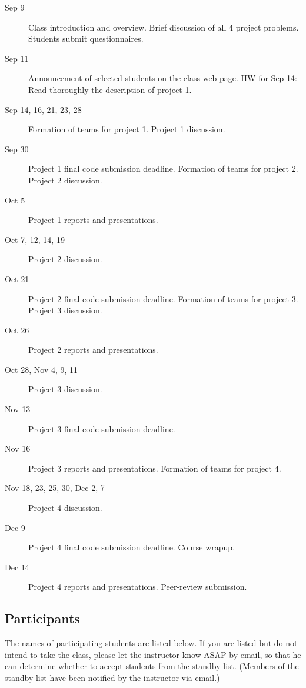 \begin{description}
\item[Sep 9] Class introduction and overview.
Brief discussion of all 4 project problems.  Students submit questionnaires.
\item[Sep 11] Announcement of selected students on the class web page.
HW for Sep 14: Read thoroughly the description of project 1.
\item[Sep 14, 16, 21, 23, 28] 
Formation of teams for project 1.
Project 1 discussion.
\item[Sep 30] Project 1 final code submission deadline.
Formation of teams for project 2.
Project 2 discussion.
\item[Oct 5] Project 1 reports and presentations.
\item[Oct 7, 12, 14, 19] Project 2 discussion.
\item[Oct 21] Project 2 final code submission deadline.
Formation of teams for project 3.
Project 3 discussion.
\item[Oct 26] Project 2 reports and presentations.
\item[Oct 28, Nov 4, 9, 11] Project 3 discussion.
\item[Nov 13] Project 3 final code submission deadline. 
\item[Nov 16] Project 3 reports and presentations. Formation of teams for project 4.
\item[Nov 18, 23, 25, 30, Dec 2, 7] Project 4 discussion.
\item[Dec 9] Project 4 final code submission deadline. Course wrapup.
\item[Dec 14] Project 4 reports and presentations. Peer-review submission. 
\end{description}

\subsection{Participants}

The names of participating students are listed below.  If you are listed but do not intend to
take the class, please let the instructor know ASAP by email, so that
he can determine whether to accept students from the standby-list.
(Members of the standby-list have been notified by the instructor via email.)

